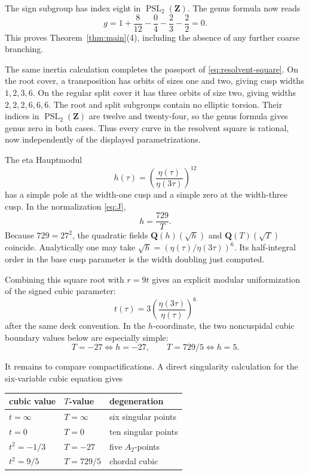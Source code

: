 \documentclass[11pt]{article}
\numberwithin{equation}{section}
\theoremstyle{definition}
\theoremstyle{remark}
\newcommand{\Q}{\mathbf Q}
\newcommand{\Z}{\mathbf Z}
\begin{document}
The sign subgroup has index eight in \(\operatorname{PSL}_2(\Z)\).  The
genus formula now reads
\[
 g=1+\frac{8}{12}-\frac{0}{4}-\frac{2}{3}-\frac{2}{2}=0.
\]
This proves Theorem~\ref{thm:main}(4), including the absence of any further
coarse branching.

The same inertia calculation completes the passport of
\eqref{eq:resolvent-square}.  On the root cover, a transposition has orbits of
sizes one and two, giving cusp widths \(1,2,3,6\).  On the regular split
cover it has three orbits of size two, giving widths
\(2,2,2,6,6,6\).  The root and split subgroups contain no elliptic torsion.
Their indices in \(\operatorname{PSL}_2(\Z)\) are twelve and twenty-four, so
the genus formula gives genus zero in both cases.  Thus every curve in the
resolvent square is rational, now independently of the displayed
parametrizations.

The eta Hauptmodul
\[
 h(\tau)=\left(\frac{\eta(\tau)}{\eta(3\tau)}\right)^{12}
\]
has a simple pole at the width-one cusp and a simple zero at the width-three
cusp.  In the normalization \eqref{eq:J},
\[
 h=\frac{729}{T}.
\]
Because \(729=27^2\), the quadratic fields
\(\Q(h)(\sqrt h)\) and \(\Q(T)(\sqrt T)\) coincide.  Analytically one may
take \(\sqrt h=(\eta(\tau)/\eta(3\tau))^6\).  Its half-integral order in the
base cusp parameter is the width doubling just computed.

Combining this square root with \(r=9t\) gives an explicit modular
uniformization of the signed cubic parameter:
\begin{equation}\label{eq:eta-t}
 \boxed{\displaystyle
 t(\tau)=3\left(\frac{\eta(3\tau)}{\eta(\tau)}\right)^6}
\end{equation}
after the same deck convention.  In the \(h\)-coordinate, the two
noncuspidal cubic boundary values below are especially simple:
\[
 T=-27\Longleftrightarrow h=-27,
 \qquad
 T=729/5\Longleftrightarrow h=5.
\]

It remains to compare compactifications.  A direct singularity calculation
for the six-variable cubic equation gives
\begin{center}
\begin{tabular}{lll}
\toprule
cubic value & \(T\)-value & degeneration \\
\midrule
\(t=\infty\) & \(T=\infty\) & six singular points \\
\(t=0\) & \(T=0\) & ten singular points \\
\(t^2=-1/3\) & \(T=-27\) & five \(A_2\)-points \\
\(t^2=9/5\) & \(T=729/5\) & chordal cubic \\
\bottomrule
\end{tabular}
\end{center}
\end{document}
